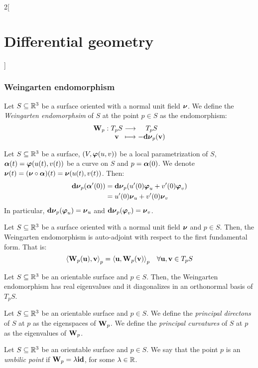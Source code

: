 \documentclass[../../../main_math.tex]{subfiles}
\begin{document}
\begin{multicols}{2}[\section{Differential geometry}]
  \subsubsection{Weingarten endomorphism}
  \begin{definition}
    Let $S\subseteq\mathbb{R}^3$ be a surface oriented with a normal unit field $\boldsymbol{\mathrm{\nu}}$. We define the \emph{Weingarten endomorphsim} of $S$ at the point $p\in S$ as the endomorphism: $$\function{\vf{W}_p}{T_pS}{T_pS}{\vf{v}}{-\vf{\dd{\nu}}_p(\vf{v})}$$
  \end{definition}
  \begin{lemma}
    Let $S\subseteq\mathbb{R}^3$ be a surface, $(V,\boldsymbol{\mathrm{\varphi}}(u,v))$ be a local parametrization of $S$, $\boldsymbol{\mathrm{\alpha}}(t)=\boldsymbol{\mathrm{\varphi}}(u(t),v(t))$ be a curve on $S$ and $p=\boldsymbol{\mathrm{\alpha}}(0)$. We denote $\boldsymbol{\mathrm{\nu}}(t)=(\boldsymbol{\mathrm{\nu}}\circ\boldsymbol{\mathrm{\alpha}})(t)=\boldsymbol{\mathrm{\nu}}(u(t),v(t))$. Then:
    \begin{align*}
      \boldsymbol{\mathrm{\dd{\nu}}}_p(\boldsymbol{\mathrm{\alpha}}'(0)) & =\boldsymbol{\mathrm{\dd{\nu}}}_p(u'(0)\boldsymbol{\mathrm{\varphi}}_u+v'(0)\boldsymbol{\mathrm{\varphi}}_v) \\
                                     & =u'(0)\boldsymbol{\mathrm{\nu}}_u+v'(0)\boldsymbol{\mathrm{\nu}}_v
    \end{align*}
    In particular, $\boldsymbol{\mathrm{\dd{\nu}}}_p(\boldsymbol{\mathrm{\varphi}}_u)=\boldsymbol{\mathrm{\nu}}_u$ and $\boldsymbol{\mathrm{\dd{\nu}}}_p(\boldsymbol{\mathrm{\varphi}}_v)=\boldsymbol{\mathrm{\nu}}_v$.
  \end{lemma}
  \begin{proposition}
    Let $S\subseteq\mathbb{R}^3$ be a surface oriented with a normal unit field $\boldsymbol{\mathrm{\nu}}$ and $p\in S$. Then, the Weingarten endomorphism is auto-adjoint with respect to the first fundamental form. That is: $${\langle \boldsymbol{\mathrm{W}}_p(\boldsymbol{\mathrm{u}}),\boldsymbol{\mathrm{v}}\rangle}_p={\langle \boldsymbol{\mathrm{u}},\boldsymbol{\mathrm{W}}_p(\boldsymbol{\mathrm{v}})\rangle}_p\quad\forall\boldsymbol{\mathrm{u}},\boldsymbol{\mathrm{v}}\in T_pS$$
  \end{proposition}
  \begin{proposition}
    Let $S\subseteq\mathbb{R}^3$ be an orientable surface and $p\in S$. Then, the Weingarten endomorphism has real eigenvalues and it diagonalizes in an orthonormal basis of $T_pS$.
  \end{proposition}
  \begin{definition}
    Let $S\subseteq\mathbb{R}^3$ be an orientable surface and $p\in S$. We define the \emph{principal directons} of $S$ at $p$ as the eigenspaces of $\boldsymbol{\mathrm{W}}_p$. We define the \emph{principal curvatures} of $S$ at $p$ as the eigenvalues of $\boldsymbol{\mathrm{W}}_p$.
  \end{definition}
  \begin{definition}
    Let $S\subseteq\mathbb{R}^3$ be an orientable surface and $p\in S$. We say that the point $p$ is an \emph{umbilic point} if $\boldsymbol{\mathrm{W}}_p=\lambda \boldsymbol{\mathrm{id}}$, for some $\lambda\in\mathbb{R}$.

\end{definition}
\end{multicols}
\end{document}
